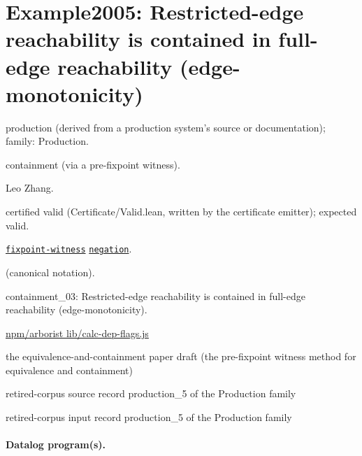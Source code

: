 \documentclass[10pt]{article}
\begin{document}
\Needspace{0.45\textheight}

\section{Example2005: Restricted-edge reachability is contained in full-edge reachability (edge-monotonicity)}\label{case:Example2005}

\begin{description}[leftmargin=2.6cm,style=nextline,itemsep=1pt]

\item[Category] production (derived from a production system's source or documentation); family: Production.

\item[Kind] containment (via a pre-fixpoint witness).

\item[Contributors] Leo Zhang.

\item[Status] certified valid (Certificate/Valid.lean, written by the certificate emitter); expected valid.

\item[Tags] \hyperref[tag:fixpoint-witness]{\texttt{fixpoint-witness}} \hyperref[tag:negation]{\texttt{negation}}.

\item[Input]  (canonical notation).

\item[Summary] containment\_03: Restricted-edge reachability is contained in full-edge reachability (edge-monotonicity).

\item[Sources] {\raggedright \href{https://github.com/npm/arborist/blob/main/lib/calc-dep-flags.js}{npm/arborist lib/calc-dep-flags.js} \par the equivalence-and-containment paper draft (the pre-fixpoint witness method for equivalence and containment) \par retired-corpus source record production\_5 of the Production family \par retired-corpus input record production\_5 of the Production family\par}

\end{description}

\paragraph{Datalog program(s).}
\end{document}
